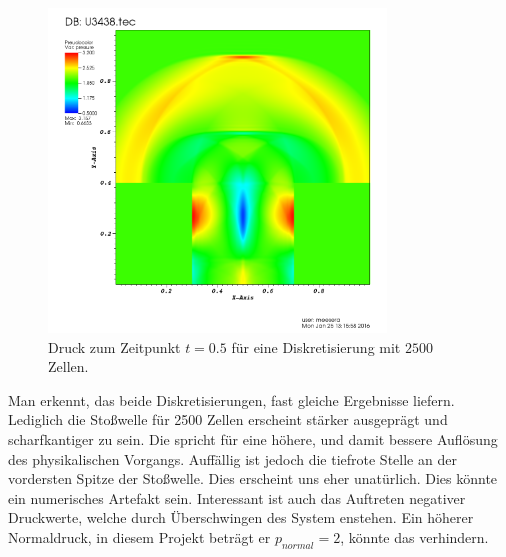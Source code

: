 \begin{figure}[H]
	\begin{center}
		\includegraphics[width=0.8\textwidth]{img/Pressure_highRes_scaled.png}
		\caption{Druck zum Zeitpunkt $t=0.5$ für eine Diskretisierung mit $2500$ Zellen.}
		\label{abb:A34}
	\end{center}
\end{figure}

Man erkennt, das beide Diskretisierungen, fast gleiche Ergebnisse liefern.
Lediglich die Stoßwelle für 2500 Zellen erscheint stärker ausgeprägt und
scharfkantiger zu sein. Die spricht für eine höhere, und damit bessere
Auflösung des physikalischen Vorgangs. Auffällig ist jedoch die tiefrote
Stelle an der vordersten Spitze der Stoßwelle. Dies erscheint uns eher
unatürlich. Dies könnte ein numerisches Artefakt sein. Interessant ist auch das
Auftreten negativer Druckwerte, welche durch Überschwingen des System enstehen.
Ein höherer Normaldruck, in diesem Projekt beträgt er $p_{normal} = 2$, könnte
das verhindern.
